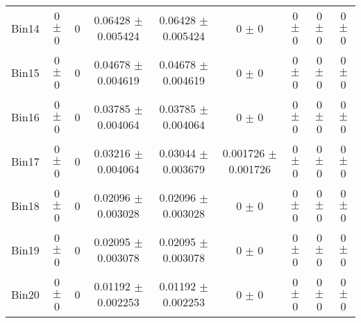 \begin{tabular}{@{\extracolsep{4pt}}lcccccccc@{}}
     Bin14 & 0 $\pm$ 0 & 0 & 0.06428 $\pm$ 0.005424 & 0.06428 $\pm$ 0.005424 & 0 $\pm$ 0 & 0 $\pm$ 0 & 0 $\pm$ 0 & 0 $\pm$ 0 \\ 
     Bin15 & 0 $\pm$ 0 & 0 & 0.04678 $\pm$ 0.004619 & 0.04678 $\pm$ 0.004619 & 0 $\pm$ 0 & 0 $\pm$ 0 & 0 $\pm$ 0 & 0 $\pm$ 0 \\ 
     Bin16 & 0 $\pm$ 0 & 0 & 0.03785 $\pm$ 0.004064 & 0.03785 $\pm$ 0.004064 & 0 $\pm$ 0 & 0 $\pm$ 0 & 0 $\pm$ 0 & 0 $\pm$ 0 \\ 
     Bin17 & 0 $\pm$ 0 & 0 & 0.03216 $\pm$ 0.004064 & 0.03044 $\pm$ 0.003679 & 0.001726 $\pm$ 0.001726 & 0 $\pm$ 0 & 0 $\pm$ 0 & 0 $\pm$ 0 \\ 
     Bin18 & 0 $\pm$ 0 & 0 & 0.02096 $\pm$ 0.003028 & 0.02096 $\pm$ 0.003028 & 0 $\pm$ 0 & 0 $\pm$ 0 & 0 $\pm$ 0 & 0 $\pm$ 0 \\ 
     Bin19 & 0 $\pm$ 0 & 0 & 0.02095 $\pm$ 0.003078 & 0.02095 $\pm$ 0.003078 & 0 $\pm$ 0 & 0 $\pm$ 0 & 0 $\pm$ 0 & 0 $\pm$ 0 \\ 
     Bin20 & 0 $\pm$ 0 & 0 & 0.01192 $\pm$ 0.002253 & 0.01192 $\pm$ 0.002253 & 0 $\pm$ 0 & 0 $\pm$ 0 & 0 $\pm$ 0 & 0 $\pm$ 0 \\ 
\hline\hline
  \end{tabular}

